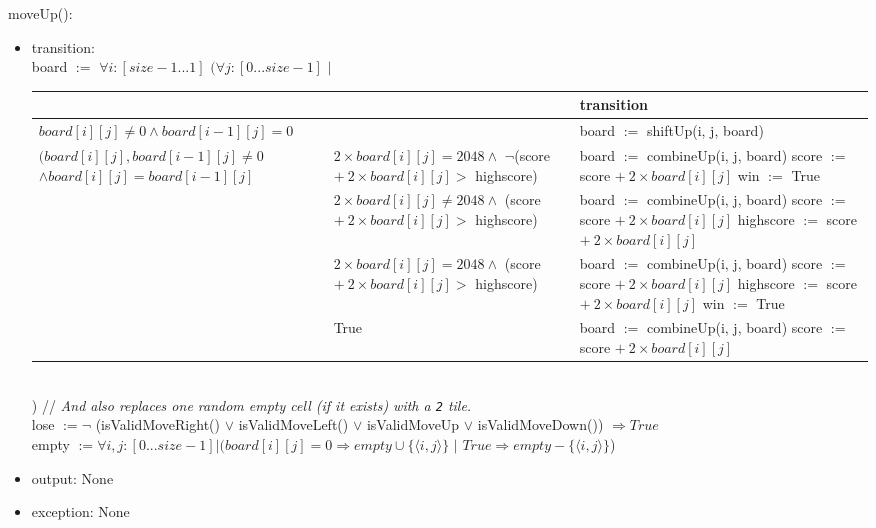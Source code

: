 \documentclass[12pt]{article}
\begin{document}
\newpage

\noindent moveUp():
\begin{itemize}
\item transition:\\ 
board $:=$ $\forall i : [size-1...1]$ $(\forall j : [0...size-1]$ $|$
\begin{table}[hbt!]
\centering
\begin{tabular}{|l|l|l|}
\cline{3-3}
\multicolumn{1}{l}{} &  & transition \\
\hline
\multicolumn{2}{|l|}{$board[i][j] \ne 0 \land board[i-1][j] = 0$} & board $:=$ shiftUp(i, j, board)\\
\hline
\shortstack{$(board[i][j], board[i-1][j] \ne 0$ \\$\land board[i][j] = board[i-1][j]$} & \shortstack{$2\times board[i][j] = 2048 \land$ \\ $\neg$(score $+ \: 2\times board[i][j] > $ highscore) } & \shortstack{board $:=$ combineUp(i, j, board)\\ score $:=$ score $+\: 2\times board[i][j]$\\ win $:=$ True}\\
\cline{2-3}
 & \shortstack{$2\times board[i][j] \ne 2048 \land$ \\ (score $+ \: 2\times board[i][j] > $ highscore) } & \shortstack{board $:=$ combineUp(i, j, board)\\ score $:=$ score $+\: 2\times board[i][j]$\\ highscore $:=$ score $+\: 2\times board[i][j]$}\\
\cline{2-3}
  & \shortstack{$2\times board[i][j] = 2048 \land$ \\ (score $+ \: 2\times board[i][j] > $ highscore) }  & \shortstack{board $:=$ combineUp(i, j, board)\\ score $:=$ score $+\: 2\times board[i][j]$\\ highscore $:=$ score $+\: 2\times board[i][j]$\\ win $:=$ True}\\
\cline{2-3}
  & True & \shortstack{board $:=$ combineUp(i, j, board)\\ score $:=$ score $+\: 2\times board[i][j]$}\\
\hline
\end{tabular}
\end{table}
\\
) // \textit{And also replaces one random empty cell (if it exists) with a \texttt{2} tile.}\\
lose $:= \neg$ (isValidMoveRight() $\lor$ isValidMoveLeft() $\lor$ isValidMoveUp $\lor$ isValidMoveDown()) $\Rightarrow True$\\
empty $:= \forall i, j : [0...size-1] | (board[i][j] = 0 \Rightarrow empty \cup \{\langle i, j \rangle\}$ $|$ $True \Rightarrow empty - \{\langle i, j \rangle\}$)
\item output: None
\item exception: None
\end{itemize}
\end{document}
